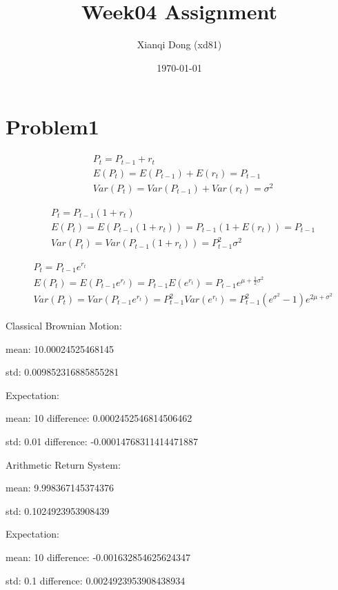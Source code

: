 \documentclass{article}
\title{Week04 Assignment}
\author{Xianqi Dong (xd81)}
\date{\today}
\begin{document}
\maketitle
\section{Problem1}
\begin{equation}
\begin{split}
& P_t = P_{t-1} + r_t \\
& E(P_t) = E(P_{t-1}) + E(r_t) = P_{t-1} \\
& Var(P_t) = Var(P_{t-1}) + Var(r_t) = \sigma^2
\end{split}
\end{equation}

\begin{equation}
\begin{split}
& P_t = P_{t-1}(1 + r_t) \\
& E(P_t) = E(P_{t-1}(1 + r_t)) = P_{t-1}(1 + E(r_t)) = P_{t-1} \\
& Var(P_t) = Var(P_{t-1}(1 + r_t)) = P_{t-1}^2\sigma^2
\end{split}
\end{equation}

\begin{equation}
\begin{split}
& P_t = P_{t-1}e^{r_t} \\
& E(P_t) = E(P_{t-1}e^{r_t}) = P_{t-1}E(e^{r_t}) = P_{t-1}e^{\mu+\frac{1}{2}\sigma^2} \\
& Var(P_t) = Var(P_{t-1}e^{r_t}) = P_{t-1}^2Var(e^{r_t}) = P_{t-1}^2(e^{\sigma^2}-1)e^{2\mu+\sigma^2}
\end{split}
\end{equation}

Classical Brownian Motion: \par
mean:  10.00024525468145\par
std:  0.009852316885855281\par
Expectation: \par
mean:  10       difference:  0.0002452546814506462\par
std:  0.01      difference:  -0.00014768311414471887\par

Arithmetic Return System: \par
mean:  9.998367145374376\par
std:  0.1024923953908439\par
Expectation: \par
mean:  10       difference:  -0.001632854625624347\par
std:  0.1       difference:  0.0024923953908438934\par
\end{document}
